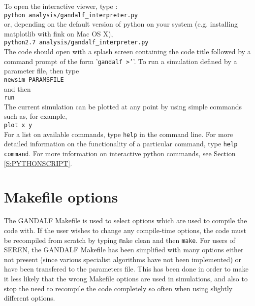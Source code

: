 \documentclass[a4paper]{article}
\newcommand{\var}[1]{\texttt{#1}}
\begin{document}
\noindent To open the interactive viewer, type : \\
\newline
\var{python analysis/gandalf\_interpreter.py} \\
\newline
or, depending on the default version of python on your system (e.g. installing matplotlib with fink on Mac OS X), \\
\newline
\var{python2.7 analysis/gandalf\_interpreter.py} \\
\newline
\noindent The code should open with a splash screen containing the code title followed by a command prompt of the form '\var{gandalf >'}'.  To run a simulation defined by a parameter file, then type \\
\newline
\var{newsim PARAMSFILE} \\
\newline
\noindent and then \\
\newline
\var{run} \\
\newline
\noindent The current simulation can be plotted at any point by using simple commands such as, for example, \\
\newline
\var{plot x y} \\
\newline
\noindent For a list on available commands, type \var{help} in the command line.  For more detailed information on the functionality of a particular command, type \var{help command}.  For more information on interactive python commands, see Section \ref{S:PYTHONSCRIPT}.

\newpage



\section{Makefile options} \label{S:MAKEFILE}
The GANDALF Makefile is used to select options which are used to compile the code with.  If the user wishes to change any compile-time options, the code must be recompiled from scratch by typing {\var make clean} and then \var{make}.  For users of SEREN, the GANDALF Makefile has been simplified with many options either not present (since various specialist algorithms have not been implemented) or have been transfered to the parameters file.  This has been done in order to make it less likely that the wrong Makefile options are used in simulations, and also to stop the need to recompile the code completely so often when using slightly different options.
\end{document}
